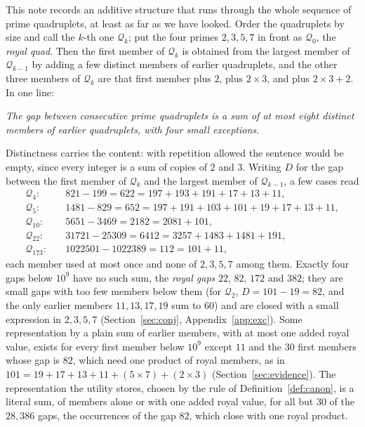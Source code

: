 \documentclass[11pt,a4paper]{article}
\newcommand{\Q}{\mathcal{Q}}
\begin{document}
This note records an additive structure that runs through the whole
sequence of prime quadruplets, at least as far as we have looked. Order the
quadruplets by size and call the $k$-th one $\Q_k$; put the four primes
$2,3,5,7$ in front as $\Q_0$, the \emph{royal quad}. Then the first member
of $\Q_k$ is obtained from the largest member of $\Q_{k-1}$ by adding a few
distinct members of earlier quadruplets, and the other three members of
$\Q_k$ are that first member plus $2$, plus $2\times3$, and plus
$2\times3+2$. In one line:
\begin{center}
\emph{The gap between consecutive prime quadruplets is a sum of at most eight distinct members of earlier quadruplets, with four small exceptions.}
\end{center}
Distinctness carries the content: with repetition allowed the sentence
would be empty, since every integer is a sum of copies of $2$ and $3$.
Writing $D$ for the gap between the first member of $\Q_k$ and the largest
member of $\Q_{k-1}$, a few cases read
\begin{align*}
\Q_4:\quad & 821-199 = 622 = 197+193+191+17+13+11,\\
\Q_5:\quad & 1481-829 = 652 = 197+191+103+101+19+17+13+11,\\
\Q_{10}:\quad & 5651-3469 = 2182 = 2081+101,\\
\Q_{22}:\quad & 31721-25309 = 6412 = 3257+1483+1481+191,\\
\Q_{173}:\quad & 1022501-1022389 = 112 = 101+11,
\end{align*}
each member used at most once and none of $2,3,5,7$ among them. Exactly
four gaps below $10^9$ have no such sum, the \emph{royal gaps} $22$, $82$,
$172$ and $382$; they are small gaps with too few members below them (for
$\Q_2$, $D=101-19=82$, and the only earlier members $11,13,17,19$ sum to
$60$) and are closed with a small expression in $2,3,5,7$
(Section~\ref{sec:conj}, Appendix~\ref{app:exc}).
Some representation by a plain sum of earlier members, with at most one
added royal value, exists for every first member below $10^9$ except $11$
and the $30$ first members whose gap is $82$, which need one product of
royal members, as in $101=19+17+13+11+(5\times7)+(2\times3)$
(Section~\ref{sec:evidence}). The representation the utility stores,
chosen by the rule of Definition~\ref{def:canon}, is a literal sum, of
members alone or with one added royal value, for all but $30$ of the
$28{,}386$ gaps, the occurrences of the gap $82$, which close with one
royal product.
\end{document}
